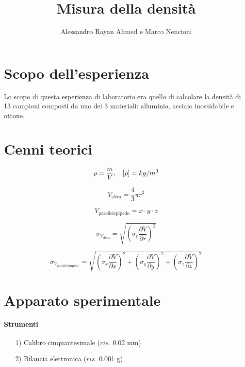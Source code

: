\documentclass[8pt]{article}
\title{Misura della densità}
\author{Alessandro Rayan Ahmed e Marco Nencioni}
\begin{document}
\maketitle
\pagebreak

\section{Scopo dell'esperienza}
Lo scopo di questa esperienza di laboratorio era quello di calcolare la densità di 13 campioni composti da uno dei 3 materiali: alluminio, acciaio inossidabile e ottone.

\section{Cenni teorici}


\begin{displaymath}
	\rho = \frac{m}{V}, \hspace{3mm} [\rho] = kg/m^3
\end{displaymath}

\begin{displaymath}
	V_{\text{sfera}} = \frac{4}{3} \pi r^3
\end{displaymath}

\begin{displaymath}
	V_{\text{parellelepipedo}} = x \cdot y \cdot z
\end{displaymath}

\begin{displaymath}
	\sigma_{V_{\text{sfera}}} = \sqrt{\left(\sigma_{r}\frac{\partial V}{\partial r}\right)^2}
\end{displaymath}

\begin{displaymath}
	\sigma_{V_{\text{parallelepipedo}}} = \sqrt{\left(\sigma_{x}\frac{\partial V}{\partial x}\right)^2 + \left(\sigma_{y}\frac{\partial V}{\partial y}\right)^2 + \left(\sigma_{z}\frac{\partial V}{\partial z}\right)^2}
\end{displaymath}

\pagebreak

\section{Apparato sperimentale}
\paragraph{Strumenti}
\begin{itemize}
\item[1)] Calibro cinquantesimale ($ris.$ 0.02 mm)
\item[2)] Bilancia elettronica ($ris.$ 0.001 g)
\end{itemize}
\end{document}
